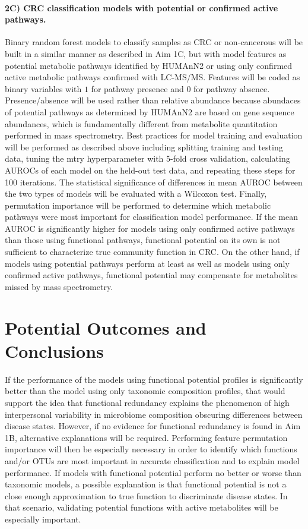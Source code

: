 \documentclass[11pt]{article}
\begin{document}
\paragraph{2C) CRC classification models with potential or confirmed active pathways.}

Binary random forest models to classify samples as CRC or non-cancerous will be built in a similar manner as described in Aim 1C, but with model features as potential metabolic pathways identified by HUMAnN2 or using only confirmed active metabolic pathways confirmed with LC-MS/MS.
Features will be coded as binary variables with $1$ for pathway presence and $0$ for pathway absence.
Presence/absence will be used rather than relative abundance because abundaces of potential pathways as determined by HUMAnN2 are based on gene sequence abundances, which is fundamentally different from metabolite quantitation performed in mass spectrometry.
Best practices for model training and evaluation will be performed as described above including splitting training and testing data, tuning the mtry hyperparameter with 5-fold cross validation, calculating AUROCs of each model on the held-out test data, and repeating these steps for 100 iterations.
The statistical significance of differences in mean AUROC between the two types of models will be evaluated with a Wilcoxon test.
Finally, permutation importance will be performed to determine which metabolic pathways were most important for classification model performance.
If the mean AUROC is significantly higher for models using only confirmed active pathways than those using functional pathways,
functional potential on its own is not sufficient to characterize true community function in CRC.
On the other hand, if models using potential pathways perform at least as well as models using only confirmed active pathways,
functional potential may compensate for metabolites missed by mass spectrometry.

\section*{Potential Outcomes and Conclusions}

If the performance of the models using functional potential profiles is significantly better than the model using only taxonomic composition profiles,
that would support the idea that functional redundancy explains the phenomenon of high interpersonal variability in microbiome composition obscuring differences between disease states.
However, if no evidence for functional redundancy is found in Aim 1B, alternative explanations will be required.
Performing feature permutation importance will then be especially necessary in order to identify which functions and/or OTUs are most important in accurate classification and to explain model performance.
If models with functional potential perform no better or worse than taxonomic models,
a possible explanation is that functional potential is not a close enough approximation to true function to discriminate disease states.
In that scenario, validating potential functions with active metabolites will be especially important.
\end{document}
